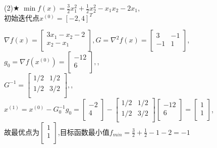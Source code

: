 \begin{problem}{(2)$\bigstar$}
    $\min f(x)=\frac{3}{2}x_1^2+\frac{1}{2}x_2^2-x_1x_2-2x_1$,\\
    初始迭代点${x^{(0)}}=[-2,4]^T$
\end{problem}
\begin{solution}
    $\nabla f(x)=\begin{bmatrix}
        3x_1-x_2-2  \\
        x_2-x_1  \\
    \end{bmatrix}, G=\nabla^2 f(x)=\begin{bmatrix}
        3   & -1  \\
        -1  & 1  \\
    \end{bmatrix}$,\\
    $g_0=\nabla f(x^{(0)})=\begin{bmatrix} -12\\6\\\end{bmatrix},$,\\
    $G^{-1}=\begin{bmatrix}
        1/2 & 1/2\\
        1/2 & 3/2\\
    \end{bmatrix},$,\\
    $x^{(1)}=x^{(0)}-G_0^{-1}g_0=\begin{bmatrix} -2\\4\\\end{bmatrix}-\begin{bmatrix}
        1/2 & 1/2\\
        1/2 & 3/2\\
    \end{bmatrix}\begin{bmatrix} -12\\6\\\end{bmatrix}=\begin{bmatrix} 1\\1\\\end{bmatrix}$,\\
    故最优点为$\begin{bmatrix} 1\\1\\\end{bmatrix}$,目标函数最小值$f_{min}=\frac{3}{2}+\frac{1}{2}-1-2=-1$
\end{solution}


